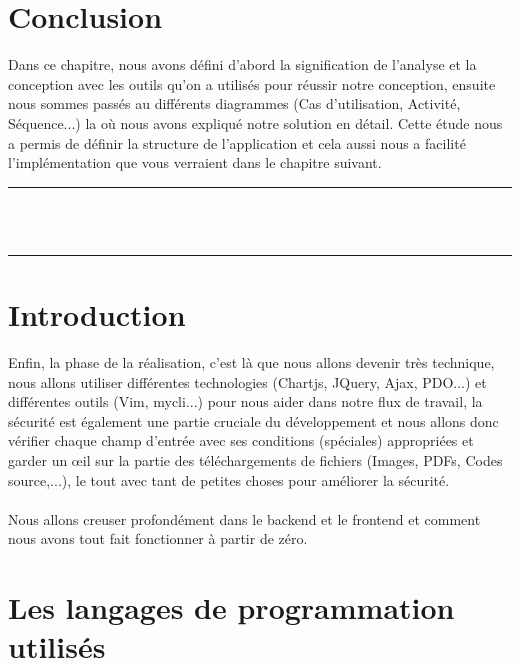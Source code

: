 \documentclass[12pt]{report}
\begin{document}
\section{Conclusion}
Dans ce chapitre, nous avons défini d'abord la signification de l'analyse et la conception avec les outils qu'on a utilisés pour réussir notre conception, ensuite nous sommes passés au différents diagrammes (Cas d'utilisation, Activité, Séquence...) la où nous avons expliqué notre solution en détail. Cette étude nous a permis de définir la structure de l’application et cela aussi nous a facilité l’implémentation que vous verraient dans le chapitre suivant.

\newpage

\vspace*{\fill}
\begin{center}
    {\color{Blue} \rule{\linewidth}{1.2mm} }\\
\vspace{0.25in}
    {\centering{}}
\vspace{0.35in}\\
    {\color{Blue} \rule{\linewidth}{1.2mm} }
\end{center}
\vspace*{\fill}
\setcounter{section}{0}

\newpage

\section{Introduction}

Enfin, la phase de la réalisation, c'est là que nous allons devenir très technique, nous allons utiliser différentes technologies (Chartjs, JQuery, Ajax, PDO...) et différentes outils (Vim, mycli...) pour nous aider dans notre flux de travail, la sécurité est également une partie cruciale du développement et nous allons donc vérifier chaque champ d'entrée avec ses conditions (spéciales) appropriées et garder un œil sur la partie des téléchargements de fichiers (Images, PDFs, Codes source,...), le tout avec tant de petites choses pour améliorer la sécurité.
\\\\
Nous allons creuser profondément dans le backend et le frontend et comment nous avons tout fait fonctionner à partir de zéro.

\section{Les langages de programmation utilisés}
\end{document}
